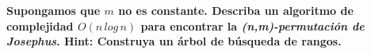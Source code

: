 \textbf{Supongamos que $m$ no es constante. Describa un algoritmo de complejidad
$O(n \, log \, n)$ para encontrar la \textit{(n,m)-permutación de Josephus}. 
Hint: Construya un árbol de búsqueda de rangos.}